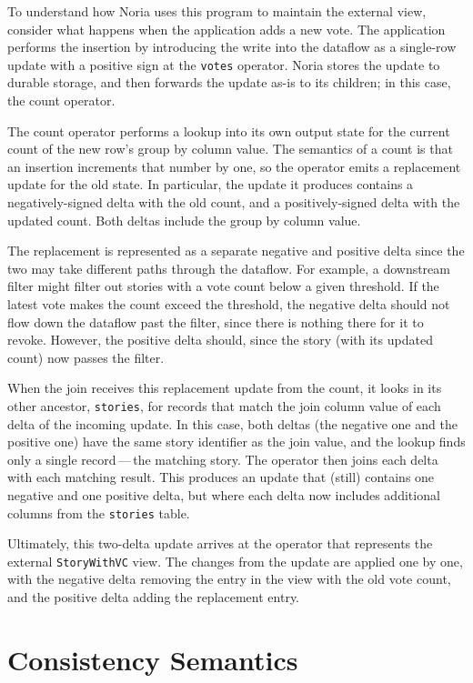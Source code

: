 To understand how Noria uses this program to maintain the external view,
consider what happens when the application adds a new vote. The application
performs the insertion by introducing the write into the dataflow as a
single-row update with a positive sign at the \texttt{votes} operator. Noria
stores the update to durable storage, and then forwards the update as-is to its
children; in this case, the count operator.

The count operator performs a lookup into its own output state for the current
count of the new row's group by column value. The semantics of a count is that
an insertion increments that number by one, so the operator emits a replacement
update for the old state. In particular, the update it produces contains a
negatively-signed delta with the old count, and a positively-signed delta with
the updated count. Both deltas include the group by column value.

The replacement is represented as a separate negative and positive delta since
the two may take different paths through the dataflow. For example, a downstream
filter might filter out stories with a vote count below a given threshold. If
the latest vote makes the count exceed the threshold, the negative delta should
not flow down the dataflow past the filter, since there is nothing there for it
to revoke. However, the positive delta should, since the story (with its updated
count) now passes the filter.

When the join receives this replacement update from the count, it looks in its
other ancestor, \texttt{stories}, for records that match the join column value
of each delta of the incoming update. In this case, both deltas (the negative
one and the positive one) have the same story identifier as the join value, and
the lookup finds only a single record\,---\,the matching story. The operator
then joins each delta with each matching result. This produces an update that
(still) contains one negative and one positive delta, but where each delta now
includes additional columns from the \texttt{stories} table.

Ultimately, this two-delta update arrives at the operator that represents the
external \texttt{StoryWithVC} view. The changes from the update are applied one
by one, with the negative delta removing the entry in the view with the old vote
count, and the positive delta adding the replacement entry.

\section{Consistency Semantics}
\label{s:noria:consistency}

